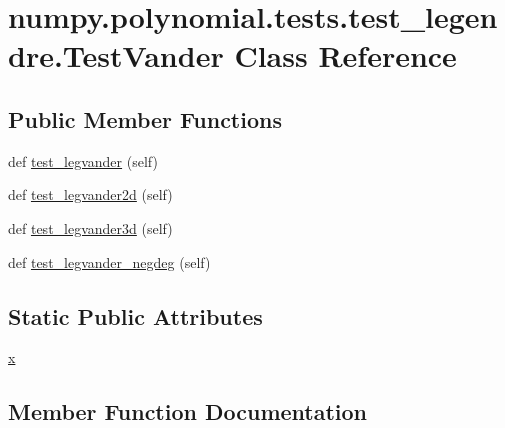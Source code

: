 \hypertarget{classnumpy_1_1polynomial_1_1tests_1_1test__legendre_1_1TestVander}{}\section{numpy.\+polynomial.\+tests.\+test\+\_\+legendre.\+Test\+Vander Class Reference}
\label{classnumpy_1_1polynomial_1_1tests_1_1test__legendre_1_1TestVander}
\subsection*{Public Member Functions}
\begin{DoxyCompactItemize}
\item 
def \hyperlink{classnumpy_1_1polynomial_1_1tests_1_1test__legendre_1_1TestVander_a86fa3f73ac77fdf62cd9f4c2ea835448}{test\+\_\+legvander} (self)
\item 
def \hyperlink{classnumpy_1_1polynomial_1_1tests_1_1test__legendre_1_1TestVander_aa738bce4c536a52597c4a7778ff2bdbc}{test\+\_\+legvander2d} (self)
\item 
def \hyperlink{classnumpy_1_1polynomial_1_1tests_1_1test__legendre_1_1TestVander_a44b8ceed135378abd4cc6e112277f557}{test\+\_\+legvander3d} (self)
\item 
def \hyperlink{classnumpy_1_1polynomial_1_1tests_1_1test__legendre_1_1TestVander_aafa1f79f0836ad9e0337fdd2d6ef5f5e}{test\+\_\+legvander\+\_\+negdeg} (self)
\end{DoxyCompactItemize}
\subsection*{Static Public Attributes}
\begin{DoxyCompactItemize}
\item 
\hyperlink{classnumpy_1_1polynomial_1_1tests_1_1test__legendre_1_1TestVander_aaccdaa0d665d854b639ad6e821902f5e}{x}
\end{DoxyCompactItemize}


\subsection{Member Function Documentation}
\mbox{\label{classnumpy_1_1polynomial_1_1tests_1_1test__legendre_1_1TestVander_a86fa3f73ac77fdf62cd9f4c2ea835448}} 
